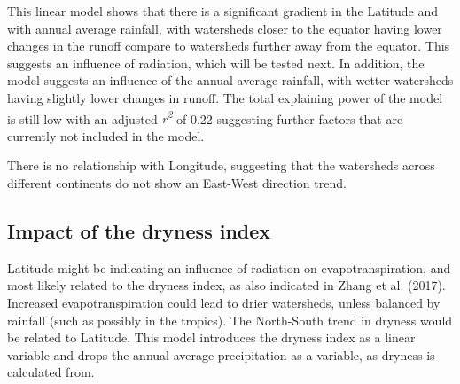 \documentclass[]{elsarticle} %
\begin{document}
This linear model shows that there is a significant gradient in the
Latitude and with annual average rainfall, with watersheds closer to the
equator having lower changes in the runoff compare to watersheds further
away from the equator. This suggests an influence of radiation, which
will be tested next. In addition, the model suggests an influence of the
annual average rainfall, with wetter watersheds having slightly lower
changes in runoff. The total explaining power of the model is still low
with an adjusted \emph{r\textsuperscript{2}} of 0.22 suggesting further
factors that are currently not included in the model.

There is no relationship with Longitude, suggesting that the watersheds
across different continents do not show an East-West direction trend.

\hypertarget{impact-of-the-dryness-index}{%
\subsection{Impact of the dryness
index}\label{impact-of-the-dryness-index}}

Latitude might be indicating an influence of radiation on
evapotranspiration, and most likely related to the dryness index, as
also indicated in Zhang et al. (2017). Increased evapotranspiration
could lead to drier watersheds, unless balanced by rainfall (such as
possibly in the tropics). The North-South trend in dryness would be
related to Latitude. This model introduces the dryness index as a linear
variable and drops the annual average precipitation as a variable, as
dryness is calculated from.
\end{document}
